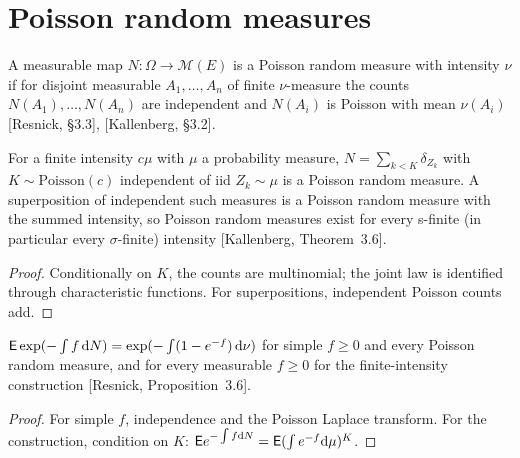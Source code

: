 \section{Poisson random measures}

\begin{definition}
  \label{def:prm}
  \leanok
  A measurable map $N \colon \Omega \to \mathcal M(E)$ is a Poisson random measure with intensity
  $\nu$ if for disjoint measurable $A_1, \dots, A_n$ of finite $\nu$-measure the counts
  $N(A_1), \dots, N(A_n)$ are independent and $N(A_i)$ is Poisson with mean $\nu(A_i)$
  [Resnick, \S3.3], [Kallenberg, \S3.2].
\end{definition}

\begin{theorem}
  \label{thm:prm-exists}
  \leanok
  For a finite intensity $c\mu$ with $\mu$ a probability measure, $N = \sum_{k < K} \delta_{Z_k}$ with
  $K \sim \mathrm{Poisson}(c)$ independent of iid $Z_k \sim \mu$ is a Poisson random measure. A
  superposition of independent such measures is a Poisson random measure with the summed intensity,
  so Poisson random measures exist for every s-finite (in particular every $\sigma$-finite)
  intensity [Kallenberg, Theorem~3.6].
\end{theorem}
\begin{proof}
  \leanok
  Conditionally on $K$, the counts are multinomial; the joint law is identified through
  characteristic functions. For superpositions, independent Poisson counts add.
\end{proof}

\begin{theorem}
  \label{thm:prm-laplace}
  \leanok
  $\mathsf{E} \exp(-\int f \, \mathrm{d} N) = \exp(-\int (1 - e^{-f}) \, \mathrm{d}\nu)$ for simple $f \ge 0$ and every
  Poisson random measure, and for every measurable $f \ge 0$ for the finite-intensity
  construction [Resnick, Proposition~3.6].
\end{theorem}
\begin{proof}
  \leanok
  For simple $f$, independence and the Poisson Laplace transform. For the construction, condition on
  $K$: $\mathsf{E} e^{-\int f \mathrm{d} N} = \mathsf{E} (\int e^{-f} \mathrm{d}\mu)^K$.
\end{proof}

